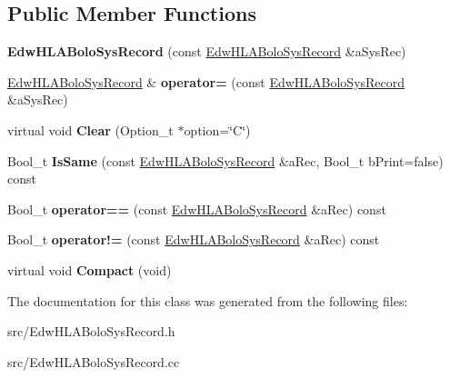 \subsection*{Public Member Functions}
\begin{DoxyCompactItemize}
\item 
\hypertarget{class_edw_h_l_a_bolo_sys_record_a46be9e49116ac5c5408beed591c6a82a}{
{\bfseries EdwHLABoloSysRecord} (const \hyperlink{class_edw_h_l_a_bolo_sys_record}{EdwHLABoloSysRecord} \&aSysRec)}
\label{class_edw_h_l_a_bolo_sys_record_a46be9e49116ac5c5408beed591c6a82a}

\item 
\hypertarget{class_edw_h_l_a_bolo_sys_record_aab21ea309b2c29c8cf48317f9a0129bc}{
\hyperlink{class_edw_h_l_a_bolo_sys_record}{EdwHLABoloSysRecord} \& {\bfseries operator=} (const \hyperlink{class_edw_h_l_a_bolo_sys_record}{EdwHLABoloSysRecord} \&aSysRec)}
\label{class_edw_h_l_a_bolo_sys_record_aab21ea309b2c29c8cf48317f9a0129bc}

\item 
\hypertarget{class_edw_h_l_a_bolo_sys_record_af6a862be0b741ea56a90c67c2c982a0d}{
virtual void {\bfseries Clear} (Option\_\-t $\ast$option=\char`\"{}C\char`\"{})}
\label{class_edw_h_l_a_bolo_sys_record_af6a862be0b741ea56a90c67c2c982a0d}

\item 
\hypertarget{class_edw_h_l_a_bolo_sys_record_aa7811a22c20d70d469d6213f93bb5f65}{
Bool\_\-t {\bfseries IsSame} (const \hyperlink{class_edw_h_l_a_bolo_sys_record}{EdwHLABoloSysRecord} \&aRec, Bool\_\-t bPrint=false) const }
\label{class_edw_h_l_a_bolo_sys_record_aa7811a22c20d70d469d6213f93bb5f65}

\item 
\hypertarget{class_edw_h_l_a_bolo_sys_record_aa044600c343d22784c7fa7a901e8b3c0}{
Bool\_\-t {\bfseries operator==} (const \hyperlink{class_edw_h_l_a_bolo_sys_record}{EdwHLABoloSysRecord} \&aRec) const }
\label{class_edw_h_l_a_bolo_sys_record_aa044600c343d22784c7fa7a901e8b3c0}

\item 
\hypertarget{class_edw_h_l_a_bolo_sys_record_a081897c6979cf2a25029d84814dde0b2}{
Bool\_\-t {\bfseries operator!=} (const \hyperlink{class_edw_h_l_a_bolo_sys_record}{EdwHLABoloSysRecord} \&aRec) const }
\label{class_edw_h_l_a_bolo_sys_record_a081897c6979cf2a25029d84814dde0b2}

\item 
\hypertarget{class_edw_h_l_a_bolo_sys_record_a1d8f1e3293c9e23e79e8df9a5eda1890}{
virtual void {\bfseries Compact} (void)}
\label{class_edw_h_l_a_bolo_sys_record_a1d8f1e3293c9e23e79e8df9a5eda1890}

\end{DoxyCompactItemize}


The documentation for this class was generated from the following files:\begin{DoxyCompactItemize}
\item 
src/EdwHLABoloSysRecord.h\item 
src/EdwHLABoloSysRecord.cc\end{DoxyCompactItemize}
